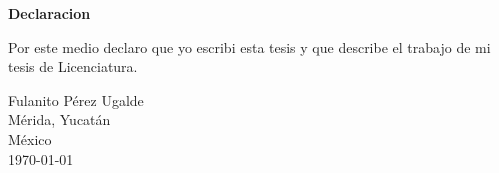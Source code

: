 \begin{center}


{\Large {\bf Declaracion}}

Por este medio declaro que yo escribi esta tesis y que describe el trabajo de
mi tesis de Licenciatura.

\end{center}



\vspace*{2in}
\begin{center}
Fulanito Pérez Ugalde\\
Mérida, Yucatán\\
México\\
\today
\end{center}


